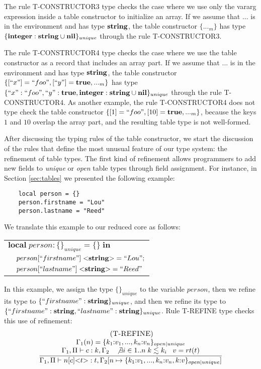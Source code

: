 The rule \textsc{T-CONSTRUCTOR3} type checks the case where we use
only the vararg expression inside a table constructor to initialize
an array.
If we assume that $...$ is in the environment and has type $\mathbf{string}$,
the table constructor $\{{...}_{m}\}$ has type $\{\mathbf{integer}:\mathbf{string} \cup \mathbf{nil}\}_{unique}$
through the rule \textsc{T-CONSTRUCTOR3}.

The rule \textsc{T-CONSTRUCTOR4} type checks the case where we use
the table constructor as a record that includes an array part.
If we assume that $...$ is in the environment and has type $\mathbf{string}$,
the table constructor $\{[``x"] = ``foo", [``y"] = \mathbf{true}, {...}_{m}\}$
has type $\{``x":``foo", ``y":\mathbf{true}, \mathbf{integer}:\mathbf{string} \cup \mathbf{nil}\}_{unique}$
through the rule \textsc{T-CONSTRUCTOR4}.
As another example, the rule \textsc{T-CONSTRUCTOR4} does not type check
the table constructor $\{ [1] = ``foo", [10] = \mathbf{true}, {...}_{m} \}$,
because the keys $1$ and $10$ overlap the array part,
and the resulting table type is not well-formed.

After discussing the typing rules of the table constructor,
we start the discussion of the rules that define the most
unusual feature of our type system: the refinement of table types.
The first kind of refinement allows programmers to add new
fields to \emph{unique} or \emph{open} table types through
field assignment.
For instance, in Section \ref{sec:tables} we presented the
following example:
\begin{verbatim}
    local person = {}
    person.firstname = "Lou"
    person.lastname = "Reed"
\end{verbatim}

We translate this example to our reduced core as follows:
\begin{center}
\begin{tabular}{ll}
\multicolumn{2}{l}{$\mathbf{local} \; person:\{\}_{unique} = \{\} \; \mathbf{in}$}\\
& \multicolumn{1}{l}{$person[``firstname"] \; {<}\mathbf{string}{>} = ``Lou";$}\\
& \multicolumn{1}{l}{$person[``lastname"] \; {<}\mathbf{string}{>} = ``Reed"$}
\end{tabular}
\end{center}

In this example, we assign the type $\{\}_{unique}$ to the variable
$person$, then we refine its type to $\{``firstname":\mathbf{string}\}_{unique}$,
and then we refine its type to $\{``firstname":\mathbf{string}, ``lastname":\mathbf{string}\}_{unique}$.
Rule \textsc{T-REFINE} type checks this use of refinement:
\[
\begin{array}{c}
\; (\textsc{T-REFINE})\\
\dfrac{\begin{array}{c}
       \Gamma_{1}(n) = \{ k_{1}{:}v_{1}, ..., k_{n}{:}v_{n} \}_{open|unique}\\
       \Gamma_{1}, \Pi \vdash c:k, \Gamma_{2} \;\;\;
       \not \exists i \in 1..n \; k \lesssim k_{i} \;\;\;
       v = rt(t)
       \end{array}}
      {\Gamma_{1}, \Pi \vdash n[c] {<}t{>}:t, \Gamma_{2}[n \mapsto \{ k_{1}{:}v_{1}, ..., k_{n}{:}v_{n}, k{:}v\}_{open|unique}]}
\end{array}
\]


